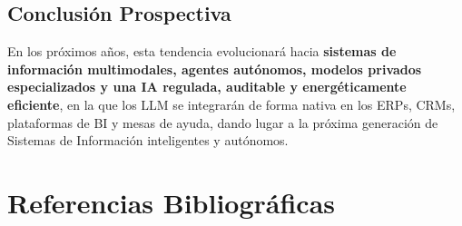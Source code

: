 \documentclass[12pt,a4paper,oneside]{article}
\begin{document}
\subsection{Conclusión Prospectiva}

En los próximos años, esta tendencia evolucionará hacia \textbf{sistemas de información multimodales, agentes autónomos, modelos privados especializados y una IA regulada, auditable y energéticamente eficiente}, en la que los LLM se integrarán de forma nativa en los ERPs, CRMs, plataformas de BI y mesas de ayuda, dando lugar a la próxima generación de Sistemas de Información inteligentes y autónomos.

\section{Referencias Bibliográficas}

\nocite{*}
\printbibliography[title={Referencias}]
\end{document}

